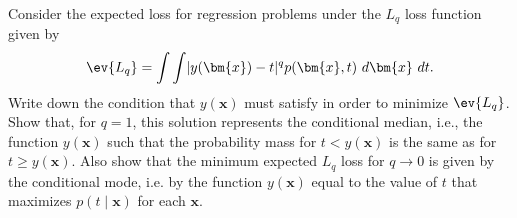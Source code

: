 \begin{question}{1.27}
	Consider the expected loss for regression problems under the $L_q$ loss function given by
	\begin{align*}
		\ev{L_q} = \int\int \lvert y(\bm{x}) - t \rvert^q p(\bm{x}, t)\ d\bm{x}\ dt.
	\end{align*}
	Write down the condition that $y(\bm{x})$ must satisfy in order to minimize $\ev{L_q}$. Show that, for $q = 1$, this solution represents the conditional median, i.e., the function $y(\bm{x})$ such that the probability mass for $t < y(\bm{x})$ is the same as for $t \geq y(\bm{x})$. Also show that the minimum expected $L_q$ loss for $q \rightarrow 0$ is given by the conditional mode, i.e. by the function $y(\bm{x})$ equal to the value of $t$ that maximizes $p(t \mid \bm{x})$ for each $\bm{x}$.
\end{question}


